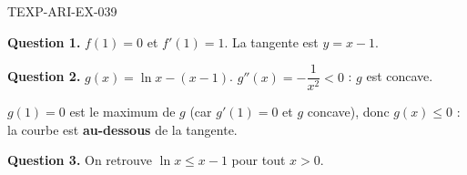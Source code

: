 \begin{corrige}{TEXP-ARI-EX-039}

\textbf{Question 1.} $f(1)=0$ et $f'(1)=1$. La tangente est $y = x - 1$.


\textbf{Question 2.} $g(x) = \ln x - (x-1)$. $g''(x) = -\dfrac{1}{x^2} < 0$ : $g$ est concave.

$g(1) = 0$ est le maximum de $g$ (car $g'(1) = 0$ et $g$ concave), donc $g(x) \leq 0$ : la courbe est \textbf{au-dessous} de la tangente.

\textbf{Question 3.} On retrouve $\ln x \leq x - 1$ pour tout $x > 0$.

\end{corrige}
